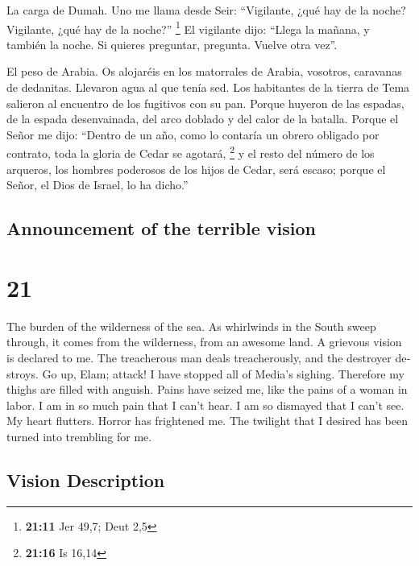 \begin{paracol}{2}
 La carga de Dumah. Uno me llama desde Seir: ``Vigilante,
¿qué hay de la noche? Vigilante, ¿qué hay de la noche?'' \footnote{\textbf{21:11}
  Jer 49,7; Deut 2,5}  El vigilante dijo: ``Llega la
mañana, y también la noche. Si quieres preguntar, pregunta. Vuelve otra
vez''.

 El peso de Arabia. Os alojaréis en los matorrales de
Arabia, vosotros, caravanas de dedanitas.  Llevaron agua
al que tenía sed. Los habitantes de la tierra de Tema salieron al
encuentro de los fugitivos con su pan.  Porque huyeron de
las espadas, de la espada desenvainada, del arco doblado y del calor de
la batalla.  Porque el Señor me dijo: ``Dentro de un año,
como lo contaría un obrero obligado por contrato, toda la gloria de
Cedar se agotará, \footnote{\textbf{21:16} Is 16,14}  y
el resto del número de los arqueros, los hombres poderosos de los hijos
de Cedar, será escaso; porque el Señor, el Dios de Israel, lo ha
dicho.''

\switchcolumn
\begin{otherlanguage}{english}

\hypertarget{announcement-of-the-terrible-vision}{%
\subsection{Announcement of the terrible
vision}\label{announcement-of-the-terrible-vision}}

\hypertarget{section-41}{%
\section{21}\label{section-41}}

 The burden of the wilderness of the sea. As whirlwinds in
the South sweep through, it comes from the wilderness, from an awesome
land.  A grievous vision is declared to me. The
treacherous man deals treacherously, and the destroyer destroys. Go up,
Elam; attack! I have stopped all of Media's sighing. 
Therefore my thighs are filled with anguish. Pains have seized me, like
the pains of a woman in labor. I am in so much pain that I can't hear. I
am so dismayed that I can't see.  My heart flutters.
Horror has frightened me. The twilight that I desired has been turned
into trembling for me.

\hypertarget{vision-description}{%
\subsection{Vision Description}\label{vision-description}}


\end{otherlanguage}
\end{paracol}
